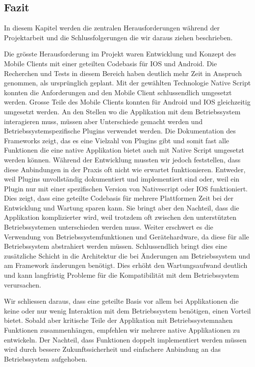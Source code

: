 \subsection{Fazit}

In diesem Kapitel werden die zentralen Herausforderungen während der Projektarbeit und die Schlussfolgerungen die wir daraus ziehen beschrieben.

Die grösste Herausforderung im Projekt waren Entwicklung und Konzept des Mobile Clients mit einer geteilten Codebasis für IOS und Android.
Die Recherchen und Tests in diesem Bereich haben deutlich mehr Zeit in Anspruch genommen, als ursprünglich geplant.
Mit der gewählten Technologie Native Script konnten die Anforderungen and den Mobile Client schlussendlich umgesetzt werden.
Grosse Teile des Mobile Clients konnten für Android und IOS gleichzeitig umgesetzt werden.
An den Stellen wo die Applikation mit dem Betriebssystem interagieren muss, müssen aber Unterschiede gemacht werden und Betriebssystemspezifische Plugins verwendet werden.
Die Dokumentation des Frameworks zeigt, das es eine Vielzahl von Plugins gibt und somit fast alle Funktionen die eine native Applikation bietet auch mit Native Script umgesetzt werden können.
Während der Entwicklung mussten wir jedoch feststellen, dass diese Anbindungen in der Praxis oft nicht wie erwartet funktionieren.
Entweder, weil Plugins unvollständig dokumentiert und implementiert sind oder, weil ein Plugin nur mit einer spezifischen Version von Nativescript oder IOS funktioniert.
Dies zeigt, dass eine geteilte Codebasis für mehrere Plattformen Zeit bei der Entwicklung und Wartung sparen kann.
Sie bringt aber den Nachteil, dass die Applikation komplizierter wird, weil trotzdem oft zwischen den unterstützten Betriebssystemen unterschieden werden muss.
Weiter erschwert es die Verwendung von Betriebssystemfunktionen und Gerätehardware, da diese für alle Betriebssystem abstrahiert werden müssen.
Schlussendlich bringt dies eine zusätzliche Schicht in die Architektur die bei Änderungen am Betriebssystem und am Framework änderungen benötigt.
Dies erhöht den Wartungsaufwand deutlich und kann langfristig Probleme für die Kompatibilität mit dem Betriebssystem verursachen.

Wir schliessen daraus, dass eine geteilte Basis vor allem bei Applikationen die keine oder nur wenig Interaktion mit dem Betriebssystem benötigen, einen Vorteil bietet.
Sobald aber kritische Teile der Applikation mit Betriebssystemnahen Funktionen zusammenhängen, empfehlen wir mehrere native Applikationen zu entwickeln.
Der Nachteil, dass Funktionen doppelt implementiert werden müssen wird durch bessere Zukunftssicherheit und einfachere Anbindung an das Betriebssystem aufgehoben.

